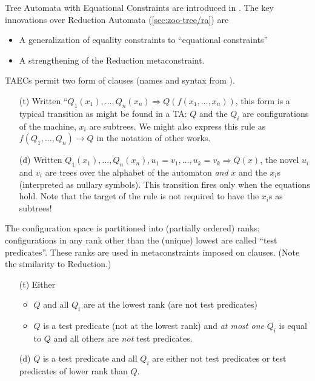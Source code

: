 Tree Automata with Equational Constraints are introduced in
\cite{jacquemard:tamodeq}.  The key innovations over Reduction Automata
(\autoref{sec:zoo-tree/ra}) are
%
\begin{itemize}
%
  \item A generalization of equality constraints to ``equational
        constraints''
  \item A strengthening of the Reduction metaconstraint.
%
\end{itemize}

TAECs permit two form of clauses (names and syntax from
\cite{jacquemard:tamodeq}).
%
\begin{itemize}
%
  \item[(t)] Written ``$Q_1(x_1),\ldots,Q_n(x_n) \Rightarrow
  Q(f(x_1,\ldots,x_n))$, this form is a typical transition as might be found
  in a TA: $Q$ and the $Q_i$ are configurations of the machine, $x_i$ are
  subtrees.  We might also express this rule as $f(Q_1,\ldots,Q_n) \to Q$ in
  the notation of other works.
%
  \item[(d)] Written $Q_1(x_1),\ldots,Q_n(x_n),u_1 = v_1,\ldots,u_k = v_k
  \Rightarrow Q(x)$, the novel $u_i$ and $v_i$ are trees over the alphabet
  of the automaton {\em and} $x$ and the $x_i$s (interpreted as nullary
  symbols).  This transition fires only when the equations hold.  Note that
  the target of the rule is not required to have the $x_i$s as subtrees!
%
\end{itemize}

The configuration space is partitioned into (partially ordered) ranks;
configurations in any rank other than the (unique) lowest are called ``test
predicates''.  These ranks are used in metaconstraints imposed on clauses.
(Note the similarity to Reduction.)
%
\begin{itemize}
%
  \item[(t)] Either
    \begin{itemize}
      \item $Q$ and all $Q_i$ are at the lowest rank (\ie are not test
      predicates)
      \item $Q$ is a test predicate (not at the lowest rank)
      and {\em at most one} $Q_i$ is equal to
      $Q$ and all others are {\em not} test predicates.
    \end{itemize}
  \item[(d)] $Q$ is a test predicate and all $Q_i$ are either not test
  predicates or test predicates of lower rank than $Q$.
%
\end{itemize}

